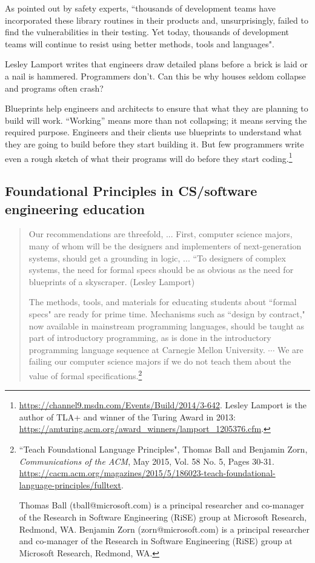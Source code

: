 \documentclass[runningheads,12pt]{article}
\begin{document}
As pointed out by safety experts, ``thousands of development teams have incorporated these library routines in their products and, unsurprisingly, failed to find the vulnerabilities in their testing. Yet today, thousands of development teams will continue to resist using better methods, tools and languages".

Lesley Lamport writes that engineers draw detailed plans before a brick is laid or a nail is hammered. Programmers don’t. Can this be why houses seldom collapse and programs often crash?

Blueprints help engineers and architects to ensure that what they are planning to build will work. ``Working” means more than not collapsing; it means serving the required purpose. Engineers and their clients use blueprints to understand what they are going to build before they start building it. But few programmers write even a rough sketch of what their programs will do before they start coding.\footnote{%
\url{https://channel9.msdn.com/Events/Build/2014/3-642}. Lesley Lamport is the  author of TLA+ and winner of the Turing Award in 2013: \url{https://amturing.acm.org/award_winners/lamport_1205376.cfm}.
}

\subsection{Foundational Principles in CS/software engineering education}
\begin{quote}
Our recommendations are threefold, ... First, computer science majors, many of whom will be the designers and implementers of next-generation systems, should get a grounding in logic, ... “To designers of complex systems, the need for formal specs should be as obvious as the need for blueprints of a skyscraper. (Lesley Lamport) 

The methods, tools, and materials for educating students about ``formal specs" are ready for prime time. Mechanisms such as ``design by contract," now available in mainstream programming languages, should be taught as part of introductory programming, as is done in the introductory programming language sequence at Carnegie Mellon University. $\cdots$ We are failing our computer science majors if we do not teach them about the value of formal specifications.\footnote{%
``Teach Foundational Language Principles", Thomas Ball and Benjamin Zorn, \textit{Communications of the ACM}, May 2015, Vol. 58 No. 5, Pages 30-31. \url{https://cacm.acm.org/magazines/2015/5/186023-teach-foundational-language-principles/fulltext}. 

Thomas Ball (tball@microsoft.com) is a principal researcher and co-manager of the Research in Software Engineering (RiSE) group at Microsoft Research, Redmond, WA. Benjamin Zorn (zorn@microsoft.com) is a principal researcher and co-manager of the Research in Software Engineering (RiSE) group at Microsoft Research, Redmond, WA.} 
\end{quote}
\end{document}
